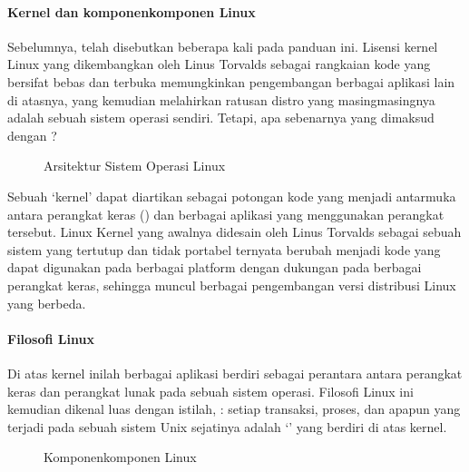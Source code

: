 \documentclass[letterpaper,10pt,english]{sphinxmanual}
\begin{document}
\paragraph{Kernel dan komponen\sphinxhyphen{}komponen Linux}
\label{\detokenize{sesi1/arsitektur:kernel-dan-komponen-komponen-linux}}
Sebelumnya, {\hyperref[\detokenize{sesi1/arsitektur:kernel}]{}} telah disebutkan beberapa kali pada panduan ini. Lisensi kernel Linux yang dikembangkan oleh Linus Torvalds sebagai rangkaian kode yang bersifat bebas dan terbuka memungkinkan pengembangan berbagai aplikasi lain di atasnya, yang kemudian melahirkan ratusan distro yang masing\sphinxhyphen{}masingnya adalah sebuah sistem operasi sendiri. Tetapi, apa sebenarnya yang dimaksud dengan ?

\begin{figure}[htbp]
\centering
\capstart

\noindent{}
\caption{Arsitektur Sistem Operasi Linux}\label{\detokenize{sesi1/arsitektur:kernel}}\end{figure}

Sebuah ‘kernel’ dapat diartikan sebagai potongan kode yang menjadi antarmuka antara perangkat keras () dan berbagai aplikasi yang menggunakan perangkat tersebut. Linux Kernel yang awalnya didesain oleh Linus Torvalds sebagai sebuah sistem yang tertutup dan tidak portabel ternyata berubah menjadi kode yang dapat digunakan pada berbagai platform dengan dukungan pada berbagai perangkat keras, sehingga muncul berbagai pengembangan versi distribusi Linux yang berbeda.


\paragraph{Filosofi Linux}
\label{\detokenize{sesi1/arsitektur:filosofi-linux}}
Di atas kernel inilah berbagai aplikasi berdiri sebagai perantara antara perangkat keras dan perangkat lunak pada sebuah sistem operasi. Filosofi Linux ini kemudian dikenal luas dengan istilah, : setiap transaksi, proses, dan apapun yang terjadi pada sebuah sistem Unix sejatinya adalah ‘’ yang berdiri di atas kernel.

\begin{figure}[htbp]
\centering
\capstart

\noindent{}
\caption{Komponen\sphinxhyphen{}komponen Linux}\label{\detokenize{sesi1/arsitektur:komponen}}\end{figure}
\end{document}
